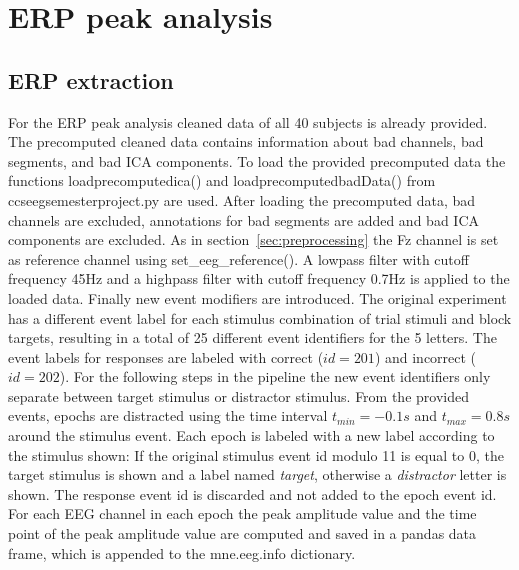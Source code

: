\documentclass[a4paper]{article}
\begin{document}
\FloatBarrier

\section{ERP peak analysis}
\label{sec:erp}

\subsection{ERP extraction}
For the ERP peak analysis cleaned data of all 40 subjects is already provided.
The precomputed cleaned data contains information about bad channels, bad segments, and bad ICA components.
To load the provided precomputed data the functions load\textunderscore precomputed\textunderscore ica() and load\textunderscore precomputed\textunderscore badData() from ccs\textunderscore eeg\textunderscore semesterproject.py are used.
After loading the precomputed data, bad channels are excluded, annotations for bad segments are added and bad ICA components are excluded.
As in section~\ref{sec:preprocessing} the Fz channel is set as reference channel using set\_eeg\_reference().
A lowpass filter with cutoff frequency 45Hz and a highpass filter with cutoff frequency 0.7Hz is applied to the loaded data.
Finally new event modifiers are introduced.
The original experiment has a different event label for each stimulus combination of trial stimuli and block targets, resulting in a total of 25 different event identifiers for the 5 letters.
The event labels for responses are labeled with correct ($id=201$) and incorrect ($id=202$).
For the following steps in the pipeline the new event identifiers only separate between target stimulus or distractor stimulus.
From the provided events, epochs are distracted using the time interval $t_{min}=-0.1s$ and $t_{max}=0.8s$ around the stimulus event.
Each epoch is labeled with a new label according to the stimulus shown: If the original stimulus event id modulo 11 is equal to 0, the target stimulus is shown and a label named \textit{target}, otherwise a \textit{distractor} letter is shown.
The response event id is discarded and not added to the epoch event id.
For each EEG channel in each epoch the peak amplitude value and the time point of the peak amplitude value are computed and saved in a pandas data frame, which is appended to the mne.eeg.info dictionary.
\end{document}
